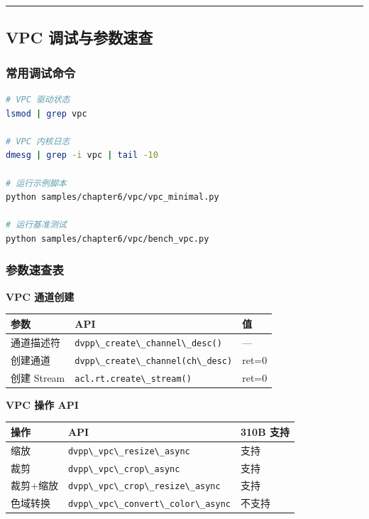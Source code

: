 \begin{center}\rule{0.5\linewidth}{0.5pt}\end{center}

\subsection{VPC 调试与参数速查}\label{src-book-chapter6-h112}

\subsubsection{常用调试命令}\label{src-book-chapter6-h113}

\begin{lstlisting}[language=bash]
# VPC 驱动状态
lsmod | grep vpc

# VPC 内核日志
dmesg | grep -i vpc | tail -10

# 运行示例脚本
python samples/chapter6/vpc/vpc_minimal.py

# 运行基准测试
python samples/chapter6/vpc/bench_vpc.py
\end{lstlisting}

\subsubsection{参数速查表}\label{src-book-chapter6-h114}

\textbf{VPC 通道创建}

\begin{longtable}[]{@{}lll@{}}
\toprule\noalign{}
参数 & API & 值 \\
\midrule\noalign{}
\endhead
\bottomrule\noalign{}
\endlastfoot
通道描述符 & \passthrough{\lstinline!dvpp\_create\_channel\_desc()!} &
--- \\
创建通道 & \passthrough{\lstinline!dvpp\_create\_channel(ch\_desc)!} &
ret=0 \\
创建 Stream & \passthrough{\lstinline!acl.rt.create\_stream()!} &
ret=0 \\
\end{longtable}

\textbf{VPC 操作 API}

\begin{longtable}[]{@{}lll@{}}
\toprule\noalign{}
操作 & API & 310B 支持 \\
\midrule\noalign{}
\endhead
\bottomrule\noalign{}
\endlastfoot
缩放 & \passthrough{\lstinline!dvpp\_vpc\_resize\_async!} & 支持 \\
裁剪 & \passthrough{\lstinline!dvpp\_vpc\_crop\_async!} & 支持 \\
裁剪+缩放 & \passthrough{\lstinline!dvpp\_vpc\_crop\_resize\_async!} &
支持 \\
色域转换 & \passthrough{\lstinline!dvpp\_vpc\_convert\_color\_async!} &
不支持 \\
\end{longtable}

